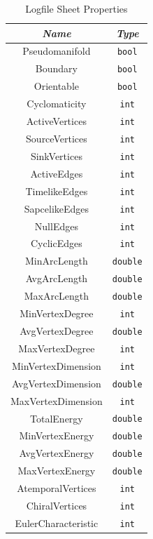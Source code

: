 \documentclass[12pt,letterpaper]{report}
\begin{document}
\begin{table}
\centering
\begin{tabular}{|c|c|}
\hline
\emph{Name} & \emph{Type} \\ \hline
Pseudomanifold & \texttt{bool} \\ \hline
Boundary & \texttt{bool} \\ \hline
Orientable & \texttt{bool} \\ \hline 
Cyclomaticity & \texttt{int} \\ \hline
ActiveVertices & \texttt{int} \\ \hline
SourceVertices & \texttt{int} \\ \hline
SinkVertices & \texttt{int} \\ \hline
ActiveEdges & \texttt{int} \\ \hline
TimelikeEdges & \texttt{int} \\ \hline
SapcelikeEdges & \texttt{int} \\ \hline
NullEdges & \texttt{int} \\ \hline
CyclicEdges & \texttt{int} \\ \hline
MinArcLength & \texttt{double} \\ \hline
AvgArcLength & \texttt{double} \\ \hline
MaxArcLength & \texttt{double} \\ \hline
MinVertexDegree & \texttt{int} \\ \hline
AvgVertexDegree & \texttt{double} \\ \hline
MaxVertexDegree & \texttt{int} \\ \hline
MinVertexDimension & \texttt{int} \\ \hline
AvgVertexDimension & \texttt{double} \\ \hline
MaxVertexDimension & \texttt{int} \\ \hline
TotalEnergy  & \texttt{double} \\ \hline
MinVertexEnergy & \texttt{double} \\ \hline
AvgVertexEnergy & \texttt{double} \\ \hline
MaxVertexEnergy & \texttt{double} \\ \hline
AtemporalVertices & \texttt{int} \\ \hline
ChiralVertices & \texttt{int} \\ \hline
EulerCharacteristic & \texttt{int} \\ \hline
\end{tabular}
\caption{Logfile Sheet Properties}
\label{log-sheet}
\end{table}
\end{document}
